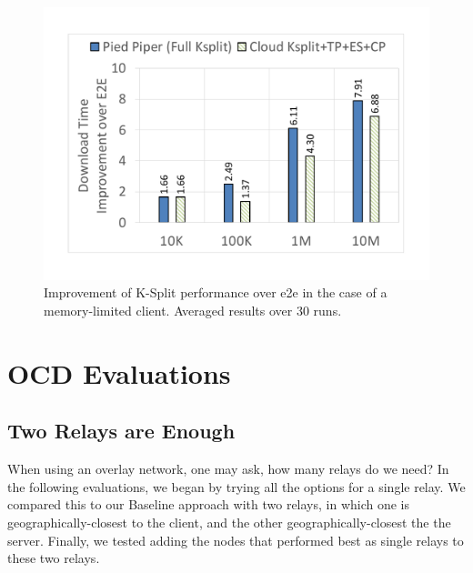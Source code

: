 \documentclass[newfonts=false,format=sigconf,anonymous,10pt,letterpaper]{acmart}
\newcommand{\ksplit}{K-Split\xspace}
\begin{document}
\begin{figure}
  \centering
    \includegraphics[width=\columnwidth,trim=20mm 25mm 25mm 25mm,clip]{figures/WeakClient-Improvement.pdf}
    \caption{Improvement of \ksplit performance over e2e in the case of a memory-limited client. Averaged results over 30 runs.} 
    \label{fig:ksplit-weak-client}
\end{figure}

\section{OCD Evaluations%
}\label{sec:baseline-good_enough}

\subsection{Two Relays are Enough}\label{subsec:num_of_relays}
When using an overlay network, one may ask, how many relays do we need? In the following evaluations, we began by trying all the options for a single relay. We compared this to our Baseline approach with two relays, in which one is geographically-closest to the client, and the other geographically-closest the the server. Finally, we  tested adding the nodes that performed best as single relays to these two relays.
\end{document}
